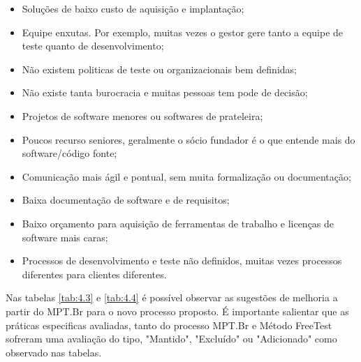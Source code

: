 \begin{itemize}
\item Soluções de baixo custo de aquisição e implantação;
\item Equipe enxutas. Por exemplo, muitas vezes o gestor gere tanto a equipe de teste quanto de desenvolvimento;
\item Não existem politicas de teste ou organizacionais bem definidas;
\item Não existe tanta burocracia e muitas pessoas tem pode de decisão;
\item Projetos de software menores ou softwares de prateleira;
\item Poucos recurso seniores, geralmente o sócio fundador é o que entende mais do software/código fonte;
\item Comunicação mais ágil e pontual, sem muita formalização ou documentação;
\item Baixa documentação de software e de requisitos;
\item Baixo orçamento para aquisição de ferramentas de trabalho e licenças de software mais caras;
\item Processos de desenvolvimento e teste não definidos, muitas vezes processos diferentes para clientes diferentes.
\end{itemize}

Nas tabelas \ref{tab:4.3} e \ref{tab:4.4} é possível observar as sugestões de melhoria a partir do MPT.Br para o novo processo proposto. É importante salientar que as práticas especificas avaliadas, tanto do processo MPT.Br e Método FreeTest sofreram uma avaliação do tipo, "Mantido", "Excluído" ou "Adicionado" como observado nas tabelas. 

